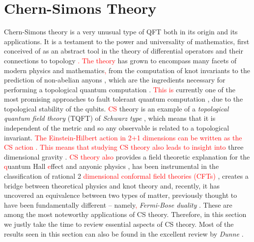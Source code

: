         \section{Chern-Simons Theory} \label{CS_sec}
    Chern-Simons \colorbox{red}{ } theory is a very unusual type of QFT both in its origin and its applications. It is a testament to the power and universality of mathematics, first conceived of as an abstract tool in the theory of differential operators and their connections to topology \cite{Chern:1974ft}\textcolor{red}{. The theory} has grown to encompass many facets of modern physics and mathematics\textcolor{red}{,} from the computation of knot invariants \cite{Witten:1988hf} to the prediction of non-abelian anyons \cite{Moore:1991ks}, which are the ingredients necessary for performing a topological quantum computation \cite{RevModPhys.80.1083}. \textcolor{red}{This is} currently one of the most promising approaches to fault tolerant quantum computation \cite{Kitaev:1997wr}, due to the topological stability of the qubits. \textcolor{red}{CS} theory is an example of a \textit{topological quantum field theory} (TQFT) of \textit{Schwarz type} \cite{Schwarz:2000ct}, which means that it is independent of the metric and so any observable is related to a topological invariant. \textcolor{red}{The Einstein-Hilbert action in 2+1 dimensions can be written as the CS action \cite{Achucarro:1987vz}. This means that studying CS theory also leads to insight into} three dimensional gravity \cite{Carlip:2005zn, Deser:1982vy, Witten:2007kt}. \textcolor{red}{CS theory also} provides a field theoretic explanation for the \textcolor{red}{q}uantum Hall \textcolor{red}{e}ffect and anyonic physics \cite{Zee, Tong:2016kpv}, has been instrumental in the classification of rational 2 \textcolor{red}{dimensional} \textcolor{red}{conformal field theories (CFTs)} \cite{Moore:1989yh}, creates a bridge between theoretical physics and knot theory \cite{Witten:1988hf} and, recently, it has uncovered an equivalence between two types of matter, previously thought to have been fundamentally different -- namely\textcolor{red}{,} \textit{Fermi-Bose duality} \cite{Aharony:2015mjs, Aharony:2012nh, Giombi:2011kc, Aharony:2011jz, Giveon:2008zn}. These are among the most noteworthy applications of CS theory. Therefore, in this section we justly take the time to review essential aspects of CS theory. Most of the results seen in this section can also be found in the excellent review by \textit{Dunne} \cite{Dunne:1998qy}.

